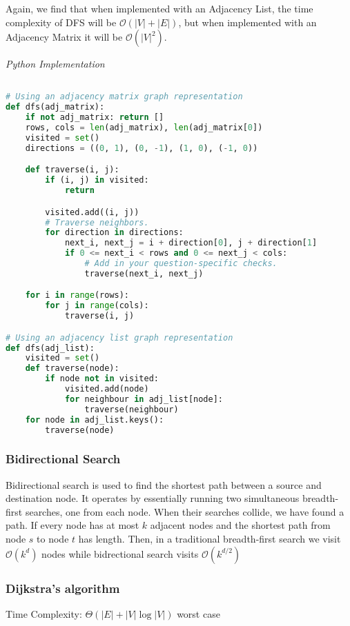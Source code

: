 \documentclass{article}
\newcommand{\bigO}{\mathcal{O}}
\begin{document}
    Again, we find that when implemented with an Adjacency List, the time complexity of DFS will be $\bigO(|V| + |E|)$, but when implemented with an Adjacency Matrix it will be $\bigO(|V|^2)$.
    
\vspace{8pt} \emph{Python Implementation}
\begin{lstlisting}[language=Python]

# Using an adjacency matrix graph representation
def dfs(adj_matrix):
    if not adj_matrix: return []
    rows, cols = len(adj_matrix), len(adj_matrix[0])
    visited = set()
    directions = ((0, 1), (0, -1), (1, 0), (-1, 0))

    def traverse(i, j):
        if (i, j) in visited:
            return

        visited.add((i, j))
        # Traverse neighbors.
        for direction in directions:
            next_i, next_j = i + direction[0], j + direction[1]
            if 0 <= next_i < rows and 0 <= next_j < cols:
                # Add in your question-specific checks.
                traverse(next_i, next_j)

    for i in range(rows):
        for j in range(cols):
            traverse(i, j)

# Using an adjacency list graph representation
def dfs(adj_list):
    visited = set()
    def traverse(node):
        if node not in visited:
            visited.add(node)
            for neighbour in adj_list[node]:
                traverse(neighbour)
    for node in adj_list.keys():
        traverse(node)
\end{lstlisting}

    \subsubsection{Bidirectional Search}
    Bidirectional search is used to find the shortest path between a source and destination node. It operates by essentially running two simultaneous breadth-first searches, one from each node. When their searches collide, we have found a path.  If every node has at most $k$ adjacent nodes and the shortest path from node $s$ to node $t$ has length. Then, in a traditional breadth-first search we visit $\mathcal{O}(k^d)$ nodes while bidrectional search visits $\mathcal{O}(k^{d/2})$

    \subsubsection{Dijkstra's algorithm}
    Time Complexity: $\Theta (|E|+|V|\log |V|)$ worst case
    
\end{document}
